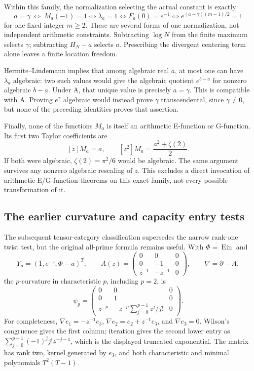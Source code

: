 \documentclass[11pt,a4paper]{article}
\newcommand{\Ein}{\operatorname{Ein}}
\theoremstyle{definition}
\theoremstyle{remark}
\numberwithin{equation}{section}
\begin{document}
Within this family, the normalization selecting the actual constant is
exactly
\begin{equation}\label{wr:eq-normalization}
 a=\gamma\ \Longleftrightarrow\ M_a(-1)=1
 \Longleftrightarrow\lambda_a=1
 \Longleftrightarrow F_a(0)=e^{-1}
 \Longleftrightarrow e^{(a-\gamma)(m-1)/2}=1
\end{equation}
for one fixed integer \(m\ge2\). These are several forms of one
normalization, not independent arithmetic constraints. Subtracting
\(\log N\) from the finite maximum selects \(\gamma\); subtracting
\(H_N-a\) selects \(a\). Prescribing the divergent centering term alone
leaves a finite location freedom.

Hermite--Lindemann implies that among algebraic real \(a\), at most one
can have \(\lambda_a\) algebraic: two such values would give the
algebraic quotient \(e^{b-a}\) for nonzero algebraic \(b-a\). Under A,
that unique value is precisely \(a=\gamma\). This is compatible with
A. Proving \(e^\gamma\) algebraic would instead prove \(\gamma\)
transcendental, since \(\gamma\ne0\), but none of the preceding
identities proves that assertion.

Finally, none of the functions \(M_a\) is itself an arithmetic
E-function or G-function. Its first two Taylor coefficients are
\[
 [z]M_a=a,\qquad [z^2]M_a=\frac{a^2+\zeta(2)}2.
\]
If both were algebraic, \(\zeta(2)=\pi^2/6\) would be algebraic. The
same argument survives any nonzero algebraic rescaling of \(z\).
This excludes a direct invocation of arithmetic E/G-function theorems
on this exact family, not every possible transformation of it.

\subsection{The earlier curvature and capacity entry tests}

The subsequent tensor-category classification supersedes the narrow
rank-one twist test, but the original all-prime formula remains useful.
With \(\Phi=\Ein\) and
\[
 Y_a=(1,e^{-z},\Phi-a)^T,\qquad
 A(z)=\begin{pmatrix}0&0&0\\0&-1&0\\z^{-1}&-z^{-1}&0\end{pmatrix},
 \qquad\nabla=\partial-A,
\]
the \(p\)-curvature in characteristic \(p\), including \(p=2\), is
\begin{equation}\label{wr:eq-curvature}
 \psi_p=
 \begin{pmatrix}
 0&0&0\\0&1&0\\
 z^{-p}&-z^{-p}\displaystyle\sum_{j=0}^{p-1}z^j/j!&0
 \end{pmatrix}.
\end{equation}
For completeness, \(\nabla e_1=-z^{-1}e_3\),
\(\nabla e_2=e_2+z^{-1}e_3\), and \(\nabla e_3=0\). Wilson's
congruence gives the first column; iteration gives the second lower
entry as \(\sum_{j=0}^{p-1}(-1)^j j!z^{-j-1}\), which is the displayed
truncated exponential. The matrix has rank two, kernel generated by
\(e_3\), and both characteristic and minimal polynomials
\(T^2(T-1)\).
\end{document}
